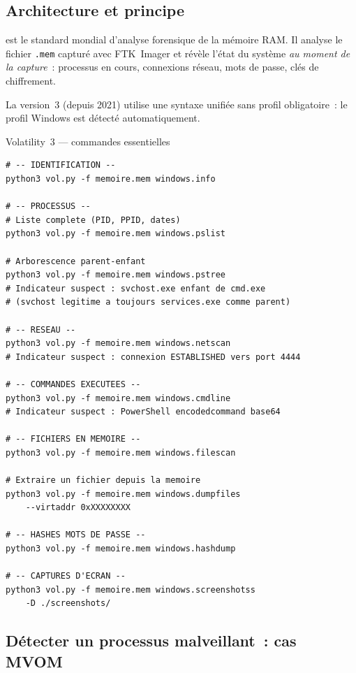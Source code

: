 \subsection{Architecture et principe}

 est le standard mondial d'analyse
forensique de la mémoire RAM. Il analyse le fichier \texttt{.mem} capturé
avec FTK~Imager et révèle l'état du système \emph{au moment de la capture}~:
processus en cours, connexions réseau, mots de passe, clés de chiffrement.

La version~3 (depuis 2021) utilise une syntaxe unifiée sans profil
obligatoire~: le profil Windows est détecté automatiquement.

\begin{boxoutils}{Volatility~3 --- commandes essentielles}
\begin{lstlisting}[language=bash_forensique]
# -- IDENTIFICATION --
python3 vol.py -f memoire.mem windows.info

# -- PROCESSUS --
# Liste complete (PID, PPID, dates)
python3 vol.py -f memoire.mem windows.pslist

# Arborescence parent-enfant
python3 vol.py -f memoire.mem windows.pstree
# Indicateur suspect : svchost.exe enfant de cmd.exe
# (svchost legitime a toujours services.exe comme parent)

# -- RESEAU --
python3 vol.py -f memoire.mem windows.netscan
# Indicateur suspect : connexion ESTABLISHED vers port 4444

# -- COMMANDES EXECUTEES --
python3 vol.py -f memoire.mem windows.cmdline
# Indicateur suspect : PowerShell encodedcommand base64

# -- FICHIERS EN MEMOIRE --
python3 vol.py -f memoire.mem windows.filescan

# Extraire un fichier depuis la memoire
python3 vol.py -f memoire.mem windows.dumpfiles
    --virtaddr 0xXXXXXXXX

# -- HASHES MOTS DE PASSE --
python3 vol.py -f memoire.mem windows.hashdump

# -- CAPTURES D'ECRAN --
python3 vol.py -f memoire.mem windows.screenshotss
    -D ./screenshots/
\end{lstlisting}
\end{boxoutils}

\subsection{Détecter un processus malveillant~: cas MVOM}

